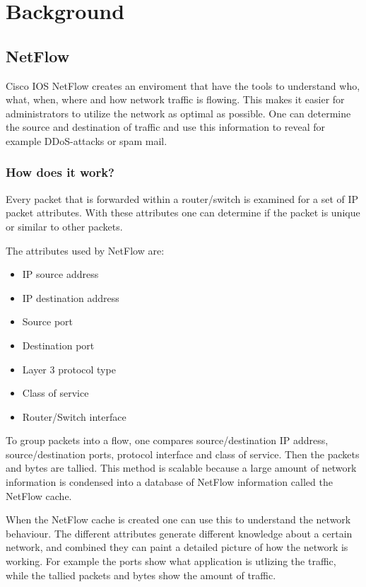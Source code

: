 \chapter{Background}
\label{chp:background} 

\section{NetFlow}
\label{netflow}
Cisco IOS NetFlow creates an enviroment that have the tools to understand who, what, when, where and how network traffic is flowing. This makes it easier for administrators to utilize the network as optimal as possible. One can determine the source and destination of traffic and use this information to reveal for example DDoS-attacks or spam mail. 

\subsection{How does it work?}
Every packet that is forwarded within a router/switch is examined for a set of IP packet attributes. With these attributes one can determine if the packet is unique or similar to other packets. 

The attributes used by NetFlow are:
\begin{itemize}
\item IP source address
\item IP destination address
\item Source port
\item Destination port
\item Layer 3 protocol type
\item Class of service
\item Router/Switch interface
\end{itemize}

To group packets into a flow, one compares source/destination IP address, source/destination ports, protocol interface and class of service. Then the packets and bytes are tallied. This method is scalable because a large amount of network information is condensed into a database of NetFlow information called the NetFlow cache. 

When the NetFlow cache is created one can use this to understand the network behaviour. The different attributes generate different knowledge about a certain network, and combined they can paint a detailed picture of how the network is working. For example the ports show what application is utlizing the traffic, while the tallied packets and bytes show the amount of traffic. 



